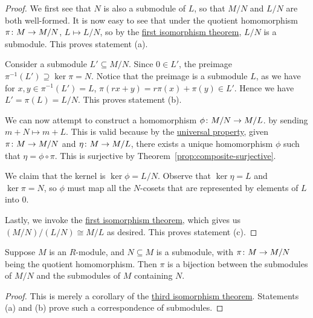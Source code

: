 \begin{proof}
    We first see that \(N\) is also a submodule of \(L\),
    so that \(M/N\) and \(L/N\) are both well-formed.
    It is now easy to see that under the quotient homomorphism \(\pi\colon M\to M/N\),
    \(L \mapsto L/N\),
    so by the \hyperref[thm:iso-1-mod]{first isomorphism theorem},
    \(L/N\) is a submodule.
    This proves statement (a).

    \medskip

    Consider a submodule \(L' \subseteq M/N\).
    Since \(0 \in L'\),
    the preimage \(\pi^{-1}(L') \supseteq \ker\pi = N\).
    Notice that the preimage is a submodule \(L\),
    as we have for \(x,y \in \pi^{-1}(L') = L\),
    \(\pi(rx+y) = r\pi(x) + \pi(y) \in L'\).
    Hence we have \(L' = \pi(L) = L/N\).
    This proves statement (b).

    \medskip

    We can now attempt to construct a homomorphism \(\phi\colon M/N\to M/L\).
    by sending \(m+N \mapsto m+L\).
    This is valid because by the \hyperref[thm:univ-prop-quotient-mod]{universal property},
    given \(\pi\colon M\to M/N\) and \(\eta\colon M\to M/L\),
    there exists a unique homomorphism \(\phi\)
    such that \(\eta = \phi\circ\pi\).
    This is surjective by Theorem~\ref{prop:composite-surjective}.

    We claim that the kernel is \(\ker\phi = L/N\).
    Observe that \(\ker\eta = L\) and \(\ker\pi = N\),
    so \(\phi\) must map all the \(N\)-cosets that are represented by elements of \(L\) into 0.

    Lastly, we invoke the \hyperref[thm:iso-1-mod]{first isomorphism theorem},
    which gives us \((M/N)/(L/N) \cong M/L\) as desired.
    This proves statement (c).
\end{proof}

\begin{theorem}\label{thm:iso-4-mod}
    Suppose \(M\) is an \(R\)-module,
    and \(N \subseteq M\) is a submodule,
    with \(\pi\colon M\to M/N\) being the quotient homomorphism.
    Then \(\pi\) is a bijection between the submodules of \(M/N\)
    and the submodules of \(M\) containing \(N\).
\end{theorem}
\begin{proof}
    This is merely a corollary of the \hyperref[thm:iso-3-mod]{third isomorphism theorem}.
    Statements (a) and (b) prove such a correspondence of submodules.
\end{proof}


